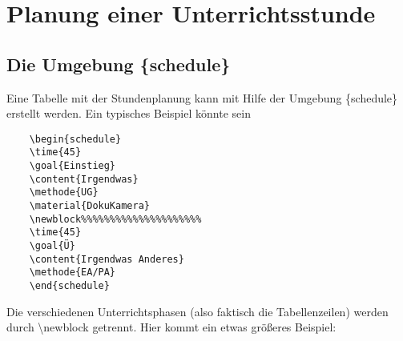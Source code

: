 \documentclass[hyperworksheet]{drcschool}
\newcommand*{\cs}[1]{\textup{\ttfamily\textbackslash#1}}                   %
\newcommand*{\env}[1]{\textup{\ttfamily\{#1\}}}                            %
\begin{document}
\section{Planung einer Unterrichtsstunde}
\subsection{Die Umgebung \{schedule\}}
Eine Tabelle mit der Stundenplanung kann mit Hilfe der Umgebung  \env{schedule} erstellt werden.
Ein typisches Beispiel könnte sein
\begin{verbatim}
    \begin{schedule}
    \time{45}
    \goal{Einstieg}
    \content{Irgendwas}
    \methode{UG}
    \material{DokuKamera}
    \newblock%%%%%%%%%%%%%%%%%%%%%
    \time{45}
    \goal{Ü}
    \content{Irgendwas Anderes}
    \methode{EA/PA}
    \end{schedule}
\end{verbatim}
Die verschiedenen Unterrichtsphasen (also faktisch die Tabellenzeilen) werden durch \cs{newblock}
getrennt. Hier kommt ein etwas größeres Beispiel:

\end{document}
